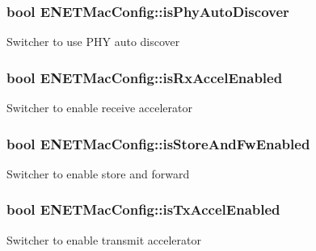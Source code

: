 \subsubsection[{\texorpdfstring{is\+Phy\+Auto\+Discover}{isPhyAutoDiscover}}]{\setlength{\rightskip}{0pt plus 5cm}bool E\+N\+E\+T\+Mac\+Config\+::is\+Phy\+Auto\+Discover}\hypertarget{structENETMacConfig_a10e0483e6fbe5c7eb797f93405851f58}{}\label{structENETMacConfig_a10e0483e6fbe5c7eb797f93405851f58}
Switcher to use P\+HY auto discover 
\subsubsection[{\texorpdfstring{is\+Rx\+Accel\+Enabled}{isRxAccelEnabled}}]{\setlength{\rightskip}{0pt plus 5cm}bool E\+N\+E\+T\+Mac\+Config\+::is\+Rx\+Accel\+Enabled}\hypertarget{structENETMacConfig_a219df26a22f8580a9bf23439a35b7f80}{}\label{structENETMacConfig_a219df26a22f8580a9bf23439a35b7f80}
Switcher to enable receive accelerator 
\subsubsection[{\texorpdfstring{is\+Store\+And\+Fw\+Enabled}{isStoreAndFwEnabled}}]{\setlength{\rightskip}{0pt plus 5cm}bool E\+N\+E\+T\+Mac\+Config\+::is\+Store\+And\+Fw\+Enabled}\hypertarget{structENETMacConfig_a8b4dd0732ef2e5bb0288d1aa0d226420}{}\label{structENETMacConfig_a8b4dd0732ef2e5bb0288d1aa0d226420}
Switcher to enable store and forward 
\subsubsection[{\texorpdfstring{is\+Tx\+Accel\+Enabled}{isTxAccelEnabled}}]{\setlength{\rightskip}{0pt plus 5cm}bool E\+N\+E\+T\+Mac\+Config\+::is\+Tx\+Accel\+Enabled}\hypertarget{structENETMacConfig_a9499feebf7cc1965e97d2d0c41d6c7e5}{}\label{structENETMacConfig_a9499feebf7cc1965e97d2d0c41d6c7e5}
Switcher to enable transmit accelerator 
